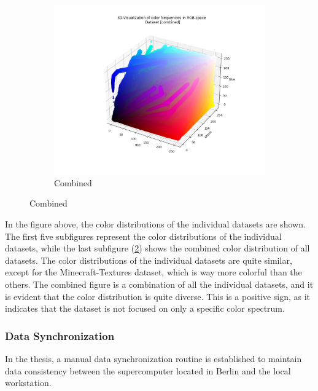 \begin{figure}[htbp]
\begin{subfigure}{.33\textwidth}
        \end{subfigure}%
        \hfill
        \begin{subfigure}{.33\textwidth}
            \centering
            \includegraphics[width=\linewidth]{../code/dataAnalysis/output/combined.png}
            \caption{Combined}
            \label{fig:dataset-Combined}
        \end{subfigure}%
        \hfill
    \end{figure}

    In the figure above, the color distributions of the individual datasets are shown. The first five subfigures represent the color distributions of the individual datasets, while the last subfigure (\ref{fig:dataset-Combined}) shows the combined color distribution of all datasets. The color distributions of the individual datasets are quite similar, except for the Minecraft-Textures dataset, which is way more colorful than the others. The combined figure is a combination of all the individual datasets, and it is evident that the color distribution is quite diverse. This is a positive sign, as it indicates that the dataset is not focused on only a specific color spectrum.

    \subsubsection{Data Synchronization}

    In the thesis, a manual data synchronization routine is established to maintain data consistency between the supercomputer located in Berlin and the local workstation.

